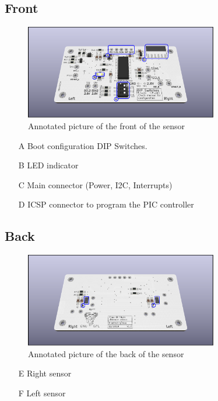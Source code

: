 \subsection{Front}
\begin{figure}[h!]
	\centering
	\includegraphics[width=0.75\textwidth]{../img/annotated-layout-front-V1.png}
	\caption{Annotated picture of the front of the sensor}	
\end{figure}
\begin{itemize}
	\item[A] Boot configuration DIP Switches.
	\item[B] LED indicator
	\item[C] Main connector (Power, I2C, Interrupts)
	\item[D] ICSP connector to program the PIC controller
\end{itemize}


\subsection{Back}
\begin{figure}[H]
	\centering
	\includegraphics[width=0.75\textwidth]{../img/annotated-layout-back-V1.png}	
	\caption{Annotated picture of the back of the sensor}
\end{figure}
\begin{itemize}
	\item[E] Right sensor
	\item[F] Left sensor
\end{itemize}
